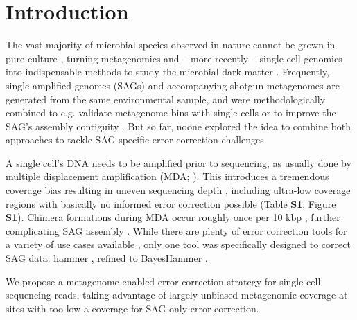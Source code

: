 \documentclass{bioinfo}
\begin{document}
\section{Introduction}

The vast majority of microbial species observed in nature cannot be grown in pure culture \citep{rappe}, turning metagenomics and -- more recently -- single cell genomics into indispensable methods to study the microbial dark matter \citep{mdm}.
Frequently, single amplified genomes (SAGs) and accompanying shotgun metagenomes are generated from the same environmental sample, and were methodologically combined to e.g. validate metagenome bins with single cells \citep{cowrumen} or to improve the SAG's assembly contiguity \citep{sr1}. %
But so far, noone explored the idea to combine both approaches to tackle SAG-specific error correction challenges.

A single cell's DNA needs to be amplified prior to sequencing, as usually done by multiple displacement amplification (MDA; \citealp{mda}).
This introduces a tremendous coverage bias resulting in uneven sequencing depth \citep{chitsaz}, including ultra-low coverage regions with basically no informed error correction possible (Table \textbf{S1}; Figure \textbf{S1}).
Chimera formations during MDA occur roughly once per 10 kbp \citep{lasken,rodrigue}, further complicating SAG assembly \citep{spades2}. %
While there are plenty of error correction tools for a variety of use cases available \citep{david}, only one tool was specifically designed to correct SAG data: hammer \citep{hammer}, refined to BayesHammer \citep{bayeshammer}.

We propose a metagenome-enabled error correction strategy for single cell sequencing reads, taking advantage of largely unbiased metagenomic coverage at sites with too low a coverage for SAG-only error correction.
\end{document}

